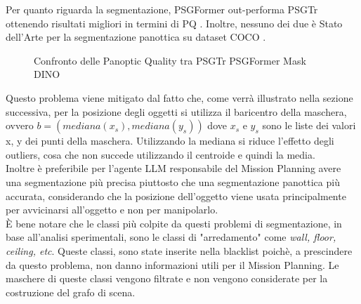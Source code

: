 \noindent
Per quanto riguarda la segmentazione, PSGFormer out-performa PSGTr ottenendo risultati migliori in termini di PQ \cite{pq}. Inoltre, nessuno dei due è Stato dell'Arte per la segmentazione panottica su dataset COCO \cite{maskdino}.\\
\begin{figure}[H]
	\centering
	\caption{Confronto delle Panoptic Quality tra PSGTr PSGFormer  Mask DINO}
	\label{fig:example_barchart}
\end{figure}
\noindent
Questo problema viene mitigato dal fatto che, come verrà illustrato nella sezione successiva, per la posizione degli oggetti si utilizza il baricentro della maschera, ovvero $b = (mediana(x_s), mediana(y_s))$ dove $x_s$ e $y_s$ sono le liste dei valori x, y dei punti della maschera. Utilizzando la mediana si riduce l'effetto degli outliers, cosa che non succede utilizzando il centroide e quindi la media. \\
Inoltre è preferibile per l'agente LLM responsabile del Mission Planning avere una segmentazione più precisa piuttosto che una segmentazione panottica più accurata, considerando che la posizione dell'oggetto viene usata principalmente per avvicinarsi all'oggetto e non per manipolarlo.\\
È bene notare che le classi più colpite da questi problemi di segmentazione, in base all'analisi sperimentali, sono le classi di "arredamento" come \textit{wall, floor, ceiling, etc}. Queste classi, sono state inserite nella blacklist poichè, a prescindere da questo problema, non danno informazioni utili per il Mission Planning. Le maschere di queste classi vengono filtrate e non vengono considerate per la costruzione del grafo di scena.

